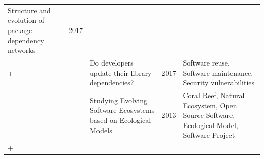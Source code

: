 \documentclass[]{book}
\begin{document}
\begin{longtable}[]{@{}lllll@{}}
\begin{minipage}[t]{0.34\columnwidth}
Structure and evolution of package dependency networks\strut
\end{minipage} & \begin{minipage}[t]{0.02\columnwidth}\raggedright\strut
2017\strut
\end{minipage} & \begin{minipage}[t]{0.39\columnwidth}\raggedright\strut
\strut
\end{minipage}\tabularnewline
\begin{minipage}[t]{0.01\columnwidth}\raggedright\strut
+\strut
\end{minipage} & \begin{minipage}[t]{0.09\columnwidth}\raggedright\strut
\citet{Kula2017}\strut
\end{minipage} & \begin{minipage}[t]{0.34\columnwidth}\raggedright\strut
Do developers update their library dependencies?\strut
\end{minipage} & \begin{minipage}[t]{0.02\columnwidth}\raggedright\strut
2017\strut
\end{minipage} & \begin{minipage}[t]{0.39\columnwidth}\raggedright\strut
Software reuse, Software maintenance, Security vulnerabilities\strut
\end{minipage}\tabularnewline
\begin{minipage}[t]{0.01\columnwidth}\raggedright\strut
-\strut
\end{minipage} & \begin{minipage}[t]{0.09\columnwidth}\raggedright\strut
\citet{Mens2013}\strut
\end{minipage} & \begin{minipage}[t]{0.34\columnwidth}\raggedright\strut
Studying Evolving Software Ecosystems based on Ecological Models\strut
\end{minipage} & \begin{minipage}[t]{0.02\columnwidth}\raggedright\strut
2013\strut
\end{minipage} & \begin{minipage}[t]{0.39\columnwidth}\raggedright\strut
Coral Reef, Natural Ecosystem, Open Source Software, Ecological Model,
Software Project\strut
\end{minipage}\tabularnewline
\begin{minipage}[t]{0.01\columnwidth}\raggedright\strut
+\strut
\end{minipage} & \begin{minipage}[t]{0.09\columnwidth}\raggedright\strut

\end{minipage}
\end{longtable}
\end{document}

